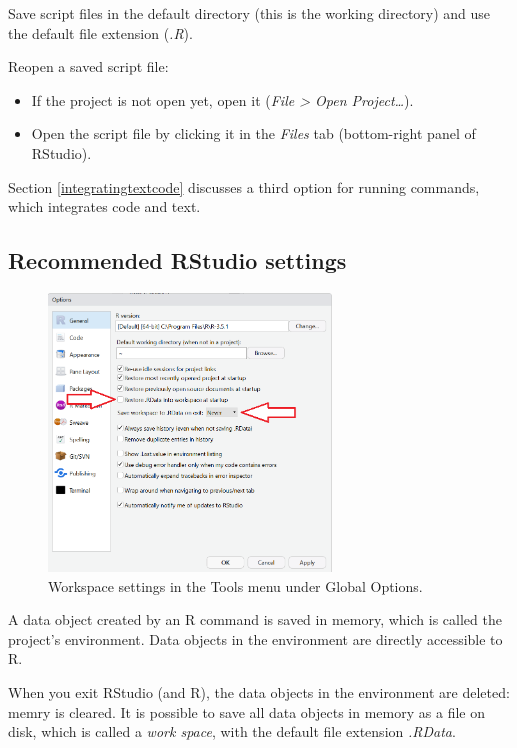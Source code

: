 \documentclass[doc,floatsintext]{apa6}
\providecommand{\tightlist}{%
  \setlength{\itemsep}{0pt}\setlength{\parskip}{0pt}}
\begin{document}
Save script files in the default directory (this is the working
directory) and use the default file extension (\emph{.R}).

Reopen a saved script file:

\begin{itemize}
\tightlist
\item
  If the project is not open yet, open it (\emph{File \textgreater{}
  Open Project\ldots{}}).
\item
  Open the script file by clicking it in the \emph{Files} tab
  (bottom-right panel of RStudio).
\end{itemize}

Section \ref{integratingtextcode} discusses a third option for running
commands, which integrates code and text.

\subsection{Recommended RStudio settings}\label{rsettings}

\begin{figure}
\includegraphics[width=2.96in]{Settings} \caption{Workspace settings in the Tools menu under Global Options.}\label{fig:RStudiosettings}
\end{figure}

A data object created by an R command is saved in memory, which is
called the project's environment. Data objects in the environment are
directly accessible to R.

When you exit RStudio (and R), the data objects in the environment are
deleted: memry is cleared. It is possible to save all data objects in
memory as a file on disk, which is called a \emph{work space}, with the
default file extension \emph{.RData}.
\end{document}
